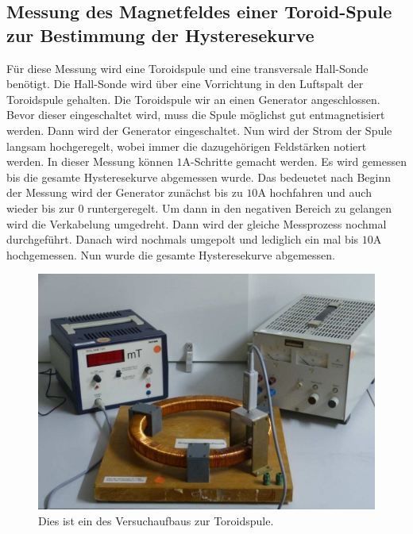 \subsection{Messung des Magnetfeldes einer Toroid-Spule zur Bestimmung der Hysteresekurve}
\label{subsec:D_Hysterese}
Für diese Messung wird eine Toroidspule und eine transversale Hall-Sonde benötigt. Die Hall-Sonde wird über eine Vorrichtung in den Luftspalt der Toroidspule gehalten. Die Toroidspule
wir an einen Generator angeschlossen. Bevor dieser eingeschaltet wird, muss die Spule möglichst gut entmagnetisiert werden. Dann wird der Generator eingeschaltet. Nun wird der Strom
der Spule langsam hochgeregelt, wobei immer die dazugehörigen Feldstärken notiert werden. In dieser Messung können $1\unit{\ampere}$-Schritte gemacht werden. Es wird gemessen bis die 
gesamte Hysteresekurve abgemessen wurde. Das bedeuetet nach Beginn der Messung wird der Generator zunächst bis zu $10\unit{\ampere}$ hochfahren und auch wieder bis zur $0$ runtergeregelt.
Um dann in den negativen Bereich zu gelangen wird die Verkabelung umgedreht. Dann wird der gleiche Messprozess nochmal durchgeführt. Danach wird nochmals umgepolt und lediglich ein mal 
bis $10\unit{\ampere}$ hochgemessen. Nun wurde die gesamte Hysteresekurve abgemessen.
\begin{figure}
    \centering
    \caption{Dies ist ein des Versuchaufbaus zur Toroidspule.\cite{v308}}
    \label{fig:Aufbau_Toroid}
    \includegraphics[width=\textwidth]{content/RingSpuleAufbau.PNG}
\end{figure}